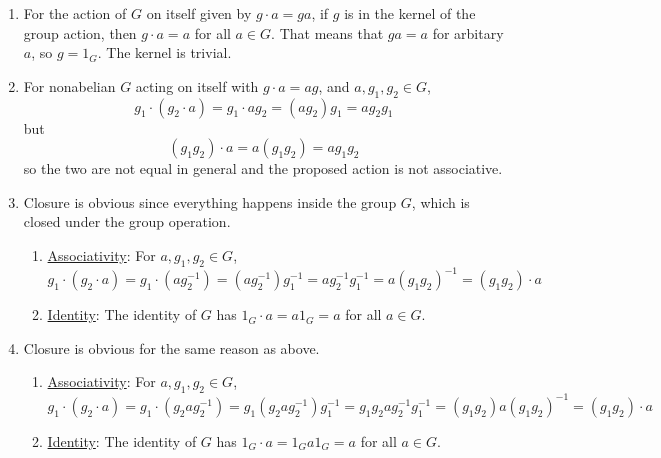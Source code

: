 \documentclass[]{article}
\begin{document}
\begin{enumerate}
\item For the action of $G$ on itself given by $g\cdot a = ga$, if $g$ is in the kernel of the group action, then $g\cdot a = a$ for all $a \in G$. That means that $ga = a$ for arbitary $a$, so $g = 1_G$. The kernel is trivial.


\item For nonabelian $G$ acting on itself with $g\cdot a = ag$, and $a, g_1, g_2 \in G$,
\begin{equation}
g_1\cdot (g_2\cdot a) = g_1\cdot ag_2 = (ag_2)g_1 = ag_2g_1
\end{equation}
but
\begin{equation}
(g_1g_2)\cdot a = a(g_1g_2) = ag_1g_2
\end{equation}
so the two are not equal in general and the proposed action is not associative.


\item Closure is obvious since everything happens inside the group $G$, which is closed under the group operation.
\begin{enumerate}
\item \underline{Associativity}: For $a, g_1, g_2 \in G$,
\begin{equation}
g_1\cdot (g_2\cdot a) = g_1\cdot(ag_2^{-1}) = (ag_2^{-1})g_1^{-1} = ag_2^{-1}g_1^{-1} = a(g_1g_2)^{-1} = (g_1g_2)\cdot a
\end{equation}
\item \underline{Identity}: The identity of $G$ has $1_G\cdot a = a1_G = a$ for all $a\in G$.
\end{enumerate}


\item Closure is obvious for the same reason as above.
\begin{enumerate}
\item \underline{Associativity}: For $a, g_1, g_2 \in G$,
\begin{equation}
g_1\cdot (g_2\cdot a) = g_1\cdot(g_2ag_2^{-1}) = g_1(g_2ag_2^{-1})g_1^{-1} = g_1g_2ag_2^{-1}g_1^{-1} = (g_1g_2)a(g_1g_2)^{-1} = (g_1g_2)\cdot a
\end{equation}
\item \underline{Identity}: The identity of $G$ has $1_G\cdot a = 1_Ga1_G = a$ for all $a\in G$.
\end{enumerate}



\end{enumerate}
\end{document}

